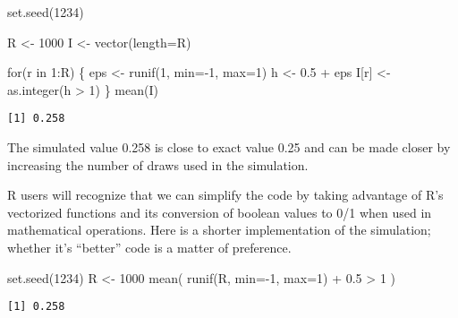 \documentclass[
  letterpaper,
  DIV=11,
  numbers=noendperiod]{scrreprt}
\newenvironment{Shaded}{\begin{snugshade}}{\end{snugshade}}
\newcommand{\AttributeTok}[1]{\textcolor[rgb]{0.40,0.45,0.13}{#1}}
\newcommand{\ControlFlowTok}[1]{\textcolor[rgb]{0.00,0.23,0.31}{#1}}
\newcommand{\DecValTok}[1]{\textcolor[rgb]{0.68,0.00,0.00}{#1}}
\newcommand{\FloatTok}[1]{\textcolor[rgb]{0.68,0.00,0.00}{#1}}
\newcommand{\FunctionTok}[1]{\textcolor[rgb]{0.28,0.35,0.67}{#1}}
\newcommand{\NormalTok}[1]{\textcolor[rgb]{0.00,0.23,0.31}{#1}}
\newcommand{\OtherTok}[1]{\textcolor[rgb]{0.00,0.23,0.31}{#1}}
\newcommand{\SpecialCharTok}[1]{\textcolor[rgb]{0.37,0.37,0.37}{#1}}
\begin{document}
\begin{Shaded}
\begin{Highlighting}[]
\FunctionTok{set.seed}\NormalTok{(}\DecValTok{1234}\NormalTok{)}

\NormalTok{R }\OtherTok{\textless{}{-}} \DecValTok{1000}
\NormalTok{I }\OtherTok{\textless{}{-}} \FunctionTok{vector}\NormalTok{(}\AttributeTok{length=}\NormalTok{R)}

\ControlFlowTok{for}\NormalTok{(r }\ControlFlowTok{in} \DecValTok{1}\SpecialCharTok{:}\NormalTok{R) \{}
\NormalTok{    eps  }\OtherTok{\textless{}{-}} \FunctionTok{runif}\NormalTok{(}\DecValTok{1}\NormalTok{, }\AttributeTok{min=}\SpecialCharTok{{-}}\DecValTok{1}\NormalTok{, }\AttributeTok{max=}\DecValTok{1}\NormalTok{)}
\NormalTok{    h    }\OtherTok{\textless{}{-}} \FloatTok{0.5} \SpecialCharTok{+}\NormalTok{ eps }
\NormalTok{    I[r] }\OtherTok{\textless{}{-}} \FunctionTok{as.integer}\NormalTok{(h }\SpecialCharTok{\textgreater{}} \DecValTok{1}\NormalTok{)}
\NormalTok{\}}
\FunctionTok{mean}\NormalTok{(I)}
\end{Highlighting}
\end{Shaded}

\begin{verbatim}
[1] 0.258
\end{verbatim}

The simulated value 0.258 is close to exact value 0.25 and can be made
closer by increasing the number of draws used in the simulation.

R users will recognize that we can simplify the code by taking advantage
of R's vectorized functions and its conversion of boolean values to 0/1
when used in mathematical operations. Here is a shorter implementation
of the simulation; whether it's ``better'' code is a matter of
preference.

\begin{Shaded}
\begin{Highlighting}[]
\FunctionTok{set.seed}\NormalTok{(}\DecValTok{1234}\NormalTok{)}
\NormalTok{R }\OtherTok{\textless{}{-}} \DecValTok{1000}
\FunctionTok{mean}\NormalTok{( }\FunctionTok{runif}\NormalTok{(R, }\AttributeTok{min=}\SpecialCharTok{{-}}\DecValTok{1}\NormalTok{, }\AttributeTok{max=}\DecValTok{1}\NormalTok{) }\SpecialCharTok{+} \FloatTok{0.5} \SpecialCharTok{\textgreater{}} \DecValTok{1}\NormalTok{ )}
\end{Highlighting}
\end{Shaded}

\begin{verbatim}
[1] 0.258
\end{verbatim}
\end{document}
